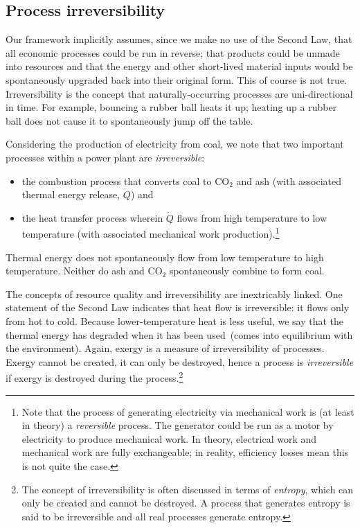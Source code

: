 \subsection{Process irreversibility}
\label{sec:irreversibility}
Our framework implicitly assumes, 
since we make no use of the Second Law,
that all economic processes could be run in reverse;
that products could be unmade into resources
and that the energy and other short-lived material
inputs would be spontaneously upgraded back into their
original form.
This of course is not true.
Irreversibility is the concept that naturally-occurring processes 
are uni-directional in time.
For example, 
bouncing a rubber ball heats it up;
heating up a rubber ball does not cause it to
spontaneously jump off the table.

Considering the production of electricity from coal,
we note that two important processes within a power plant are \emph{irreversible}:

\begin{itemize}
	\item{the combustion process that converts coal to CO$_{2}$ and ash 
	(with associated thermal energy release, $\dot{Q}$) and}
	
	\item{the heat transfer process wherein $\dot{Q}$ flows 
	from high temperature to low temperature (with associated 
	mechanical work production).\footnote{Note 
		that the process of generating
		electricity via mechanical work is (at least in theory) a
		\emph{reversible} process.
		The generator could be run as a motor by electricity to produce
		mechanical work.
		In theory,
		electrical work and mechanical work are fully exchangeable;
		in reality, efficiency losses mean this is not quite the case.}}
\end{itemize}

\noindent{}Thermal energy does not spontaneously flow from low temperature to high temperature.
Neither do ash and CO$_{2}$ spontaneously combine to form coal.

The concepts of resource quality and irreversibility are inextricably linked.
One statement of the Second Law
indicates that heat flow is irreversible: 
it flows only from hot to cold. 
Because lower-temperature heat is less useful, 
we say that the thermal energy has 
degraded when it has been used~(comes 
into equilibrium with the environment).
Again,
exergy is a measure of irreversibility of processes.
Exergy cannot be created, it can only be destroyed,
hence a process is \emph{irreversible}
if exergy is destroyed during the process.\footnote{The concept of
irreversibility is often discussed in terms of \emph{entropy},
which can only be created and cannot be destroyed.
A process that generates entropy is said to be irreversible
and all real processes generate entropy.}

